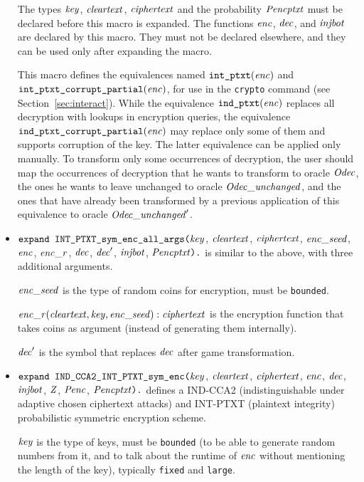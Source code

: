 \documentclass{article}
\begin{document}
\begin{itemize}
   The types $\mathit{key}$, $\mathit{cleartext}$,
   $\mathit{ciphertext}$ and the probability $\mathit{Pencptxt}$ must
   be declared before this macro is expanded. The functions
   $\mathit{enc}$, $\mathit{dec}$, and $\mathit{injbot}$ are declared by this
   macro. They must not be declared elsewhere, and they can be used
   only after expanding the macro.

   This macro defines the equivalences named
   $\texttt{int\_ptxt}(\mathit{enc})$ and
   $\texttt{int\_ptxt\_corrupt\_partial}(\mathit{enc})$, for use in the
   \texttt{crypto} command (see Section~\ref{sec:interact}).  While
   the equivalence $\texttt{ind\_ptxt}(\mathit{enc})$ replaces all
   decryption with lookups in encryption queries, the equivalence
   $\texttt{ind\_ptxt\_corrupt\_partial}(\mathit{enc})$ may replace only some of them
   and supports corruption of the key. 
   The latter equivalence can be applied only manually.
   To transform only some occurrences of decryption, 
   the user should map the occurrences of decryption that he wants to
   transform to oracle $\mathit{Odec}$, the ones he wants to leave
   unchanged to oracle $\mathit{Odec\_unchanged}$, and the ones that have
   already been transformed by a previous application of this
   equivalence to oracle $\mathit{Odec\_unchanged}'$.

\item $\texttt{expand INT\_PTXT\_sym\_enc\_all\_args(}\mathit{key}$,
$  \mathit{cleartext}$, $\mathit{ciphertext}$, $\mathit{enc\_seed}$, $\mathit{enc}$, $\mathit{enc\_r}$,
$  \mathit{dec}$, $\mathit{dec}'$, $\mathit{injbot}$, $\mathit{Pencptxt}\texttt{).}$ is similar to the above,
  with three additional arguments. 

  $\mathit{enc\_seed}$ is the type of random coins for encryption, must be \texttt{bounded}.

  $\mathit{enc\_r}(\mathit{cleartext}, \mathit{key}, \mathit{enc\_seed}): \mathit{ciphertext}$ is the encryption function that takes coins as argument (instead of generating them internally).

  $\mathit{dec}'$ is the symbol that replaces $\mathit{dec}$ after game transformation.

\item $\texttt{expand IND\_CCA2\_INT\_PTXT\_sym\_enc(}\mathit{key}$,
$  \mathit{cleartext}$, $\mathit{ciphertext}$, $\mathit{enc}$,
$  \mathit{dec}$, $\mathit{injbot}$, $\mathit{Z}$, $\mathit{Penc}$, $\mathit{Pencptxt}\texttt{).}$ defines a
  IND-CCA2 (indistinguishable under adaptive chosen ciphertext attacks) and INT-PTXT (plaintext integrity)
  probabilistic symmetric encryption scheme.

   $\mathit{key}$ is the type of keys, must be \texttt{bounded} (to be able to generate random numbers from it, and to talk about the runtime of $\mathit{enc}$ without mentioning the length of the key), typically \texttt{fixed} and \texttt{large}.


\end{itemize}
\end{document}
